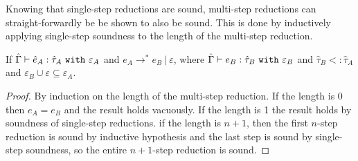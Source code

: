 Knowing that single-step reductions are sound, multi-step reductions can straight-forwardly be be shown to also be sound. This is done by inductively applying single-step soundness to the length of the multi-step reduction.

\begin{theorem}
If $\hat \Gamma \vdash \hat e_A: \hat \tau_A~\mathtt{with}~ \varepsilon_A$ and $e_A \longrightarrow^{*} e_B~|~\varepsilon$, where $\hat \Gamma \vdash e_B: \hat \tau_B~\mathtt{with}~ \varepsilon_B$ and $\hat \tau_B <: \hat \tau_A$ and $\varepsilon_B \cup \varepsilon \subseteq \varepsilon_A$.
\end{theorem}

\begin{proof} By induction on the length of the multi-step reduction. If the length is 0 then $e_A = e_B$ and the result holds vacuously. If the length is 1 the result holds by soundness of single-step reductions. if the length is $n+1$, then the first $n$-step reduction is sound by inductive hypothesis and the last step is sound by single-step soundness, so the entire $n+1$-step reduction is sound.
\end{proof}






